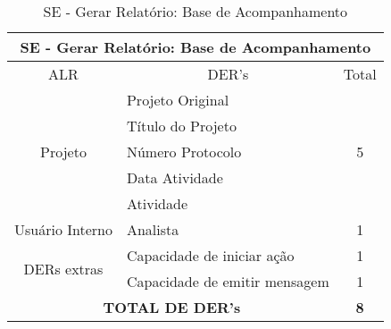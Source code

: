     \begin{table}[!h]
    \centering
    \caption{SE - Gerar Relatório: Base de Acompanhamento}
    \label{se_base_acompanhamento}
    \begin{tabular}{|c|l|c|}
    \hline
    \multicolumn{3}{|c|}{SE - Gerar Relatório: Base de Acompanhamento}            \\ \hline
    ALR                      & \multicolumn{1}{c|}{DER's}    & Total              \\ \hline
    \multirow{5}{*}{Projeto} & Projeto Original              & \multirow{5}{*}{5} \\ \cline{2-2}
			    & Título do Projeto             &                    \\ \cline{2-2}
			    & Número Protocolo              &                    \\ \cline{2-2}
			    & Data Atividade                &                    \\ \cline{2-2}
			    & Atividade                     &                    \\ \hline
    Usuário Interno                 & Analista                      & 1                  \\ \hline
    \multirow{2}{*}{DERs extras}              & Capacidade de iniciar ação    & 1                  \\ \cline{2-2}
      & Capacidade de emitir mensagem & 1                  \\ \hline
    \multicolumn{2}{|c|}{\textbf{TOTAL DE DER's}}          & \textbf{8}         \\ \hline
    \end{tabular}
    \end{table}